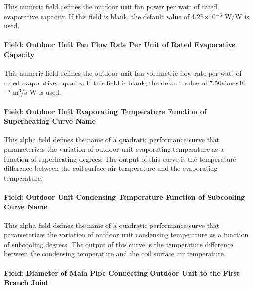 This numeric field defines the outdoor unit fan power per watt of rated evaporative capacity. If this field is blank, the default value of 4.25$\times$10$^{-3}$ W/W is used.

\paragraph{Field: Outdoor Unit Fan Flow Rate Per Unit of Rated Evaporative Capacity}\label{field-outdoor-unit-fan-flow-rate-per-unit-of-rated-evaporative-capacity}

This numeric field defines the outdoor unit fan volumetric flow rate per watt of rated evaporative capacity. If this field is blank, the default value of 7.50$times$10$^{-5}$ m\(^{3}\)/s-W is used.

\paragraph{Field: Outdoor Unit Evaporating Temperature Function of Superheating Curve Name}\label{field-outdoor-unit-evaporating-temperature-function-of-superheating-curve-name}

This alpha field defines the name of a quadratic performance curve that parameterizes the variation of outdoor unit evaporating temperature as a function of superheating degrees. The output of this curve is the temperature difference between the coil surface air temperature and the evaporating temperature.

\paragraph{Field: Outdoor Unit Condensing Temperature Function of Subcooling Curve Name}\label{field-outdoor-unit-condensing-temperature-function-of-subcooling-curve-name}

This alpha field defines the name of a quadratic performance curve that parameterizes the variation of outdoor unit condensing temperature as a function of subcooling degrees. The output of this curve is the temperature difference between the condensing temperature and the coil surface air temperature.

\paragraph{Field: Diameter of Main Pipe Connecting Outdoor Unit to the First Branch Joint}\label{field-diameter-of-main-pipe-connecting-outdoor-unit-to-indoor-units}

